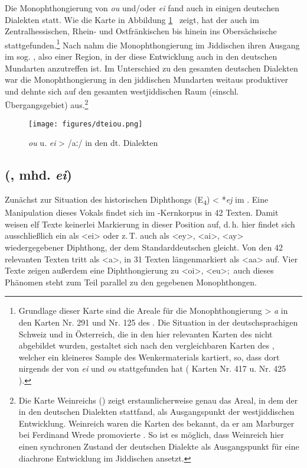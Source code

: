 Die Monophthongierung von {\mhd} \textit{ou} und/oder \textit{ei} fand auch in einigen  deutschen Dialekten statt. Wie die Karte in Abbildung \ref{dteiou}  \,%
zeigt, hat der  auch im Zentralhessischen, Rhein- und Ostfränkischen bis hinein ins Obersächsische stattgefunden.\footnote{Grundlage dieser Karte sind die Areale für die Monophthongierung > \textit{a} in den Karten Nr. 291  und Nr. 125  des . Die Situation in der deutschsprachigen Schweiz und in Österreich, die in den hier relevanten Karten des  nicht abgebildet wurden, gestaltet sich nach den vergleichbaren Karten des , welcher ein kleineres Sample des Wenkermaterials kartiert, so, dass dort nirgends der  von \textit{ei} und \textit{ou} stattgefunden hat ( Karten Nr. 417  u. Nr. 425 \,%
).} Nach \cite[66]{Weinreich1953} nahm die Monophthongierung im Jiddischen ihren Ausgang im sog. , also einer Region, in der diese Entwicklung auch in den deutschen Mundarten anzutreffen ist. Im Unterschied zu den gesamten deutschen Dialekten war die Monophthongierung in den jiddischen Mundarten weitaus produktiver und dehnte sich auf den gesamten westjiddischen Raum (einschl. Übergangsgebiet) aus.\footnote{Die Karte Weinreichs (\citeyear[66]{Weinreich1953}) zeigt erstaunlicherweise genau das Areal, in dem der  in den deutschen Dialekten stattfand, als Ausgangspunkt der westjiddischen Entwicklung. Weinreich waren die Karten des  bekannt, da er am Marburger  bei Ferdinand Wrede promovierte \parencite{Weinreich1923}. So ist es möglich, dass Weinreich hier einen synchronen Zustand der deutschen Dialekte als Ausgangspunkt für eine diachrone Entwicklung im Jiddischen ansetzt.} 

\begin{figure}
\centering
\texttt{[image: figures/dteiou.png]}
		\caption{\label{dteiou} {\MHD} \textit{ou} u. \textit{ei} > /aː/ in den dt. Dialekten}
		\end{figure} 

 
\subsection{ (, mhd. \textit{ei})}\label{phonV24}
Zunächst zur Situation des historischen Diphthongs  (E\textsubscript{4}) < {\urj} *\textit{ej} im \hai{{\LiJi}}. Eine Manipulation dieses Vokals findet sich im -Kernkorpus in 42 Texten. Damit weisen elf Texte keinerlei Markierung in dieser Position auf, d.\,h. hier findet sich ausschließlich ein als <ei> oder z.\,T. auch als <ey>, <ai>, <ay> wiedergegebener Diphthong, der dem Standarddeutschen gleicht. Von den 42 relevanten Texten tritt  als <a>, in 31 Texten längenmarkiert als <aa>  auf. Vier Texte zeigen außerdem eine Diphthongierung zu <oi>, <eu>;\, auch dieses Phänomen steht zum Teil parallel zu den gegebenen Monophthongen.  

